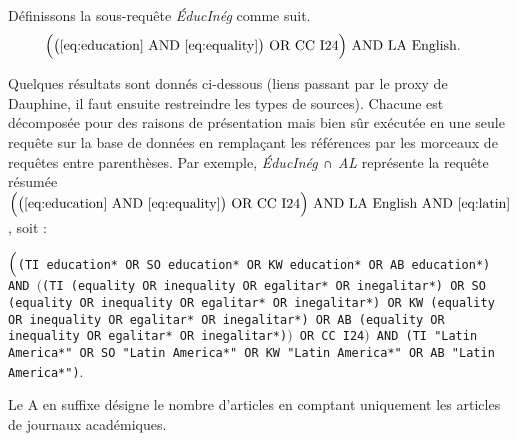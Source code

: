 \documentclass[pagesize, twoside=off, bibliography=totoc, DIV=calc, fontsize=12pt, a4paper, french]{scrartcl}
\begin{document}
Définissons la sous-requête \emph{ÉducInég} comme suit.
\begin{equation}
  \label{eq:query}
  \left.\begin{aligned}
    &\Bigl(\bigl(\eqref{eq:education} \text{ AND } \eqref{eq:equality}\bigr) \text{ OR CC I24}\Bigr)\text{ AND LA English}.
  \end{aligned}\right.
\end{equation}

Quelques résultats sont donnés ci-dessous
(liens passant par le proxy de Dauphine, il faut ensuite restreindre les types de sources).
Chacune est décomposée pour des raisons de présentation mais bien sûr exécutée en une seule requête sur la base de données en remplaçant les références par les morceaux de requêtes entre parenthèses. Par exemple, \emph{ÉducInég ∩ AL} représente la requête résumée  $\Bigl(\bigl(\eqref{eq:education} \text{ AND } \eqref{eq:equality}\bigr) \text{ OR CC I24}\Bigr)\text{ AND LA English AND }\eqref{eq:latin}$, soit : 
\begin{center}
\texttt{$\Bigl($(TI education* OR SO education* OR KW education* OR AB education*) AND $\bigl($(TI (equality OR inequality OR egalitar* OR inegalitar*) OR SO (equality OR inequality OR egalitar* OR inegalitar*) OR KW (equality OR inequality OR egalitar* OR inegalitar*) OR AB (equality OR inequality OR egalitar* OR inegalitar*)$\bigr)$ OR CC I24$\Bigr)$ AND (TI "Latin America*" OR SO "Latin America*" OR KW "Latin America*" OR AB "Latin America*")}.
\end{center}
Le A en suffixe désigne le nombre d’articles en comptant uniquement les articles de journaux académiques.
\end{document}
